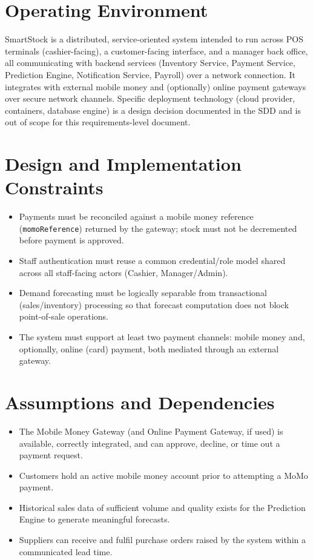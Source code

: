 \documentclass[11pt,a4paper]{report}
\begin{document}
\section{Operating Environment}
SmartStock is a distributed, service-oriented system intended to run across POS terminals (cashier-facing), a customer-facing interface, and a manager back office, all communicating with backend services (Inventory Service, Payment Service, Prediction Engine, Notification Service, Payroll) over a network connection. It integrates with external mobile money and (optionally) online payment gateways over secure network channels. Specific deployment technology (cloud provider, containers, database engine) is a design decision documented in the SDD and is out of scope for this requirements-level document.

\section{Design and Implementation Constraints}
\begin{itemize}[itemsep=2pt]
    \item Payments must be reconciled against a mobile money reference (\texttt{momoReference}) returned by the gateway; stock must not be decremented before payment is approved.
    \item Staff authentication must reuse a common credential/role model shared across all staff-facing actors (Cashier, Manager/Admin).
    \item Demand forecasting must be logically separable from transactional (sales/inventory) processing so that forecast computation does not block point-of-sale operations.
    \item The system must support at least two payment channels: mobile money and, optionally, online (card) payment, both mediated through an external gateway.
\end{itemize}

\section{Assumptions and Dependencies}
\begin{itemize}[itemsep=2pt]
    \item The Mobile Money Gateway (and Online Payment Gateway, if used) is available, correctly integrated, and can approve, decline, or time out a payment request.
    \item Customers hold an active mobile money account prior to attempting a MoMo payment.
    \item Historical sales data of sufficient volume and quality exists for the Prediction Engine to generate meaningful forecasts.
    \item Suppliers can receive and fulfil purchase orders raised by the system within a communicated lead time.
\end{itemize}
\end{document}
